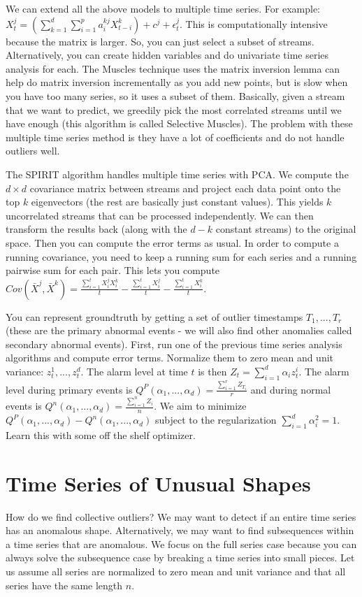 \documentclass[a4paper]{article}
\begin{document}
We can extend all the above models to multiple time series. For example:
$X_t^j = (\sum_{k=1}^{d}{\sum_{i=1}^{p}{a_i^{kj} X^k_{t-i}}}) + c^j +
\epsilon_t^j$. This is computationally intensive because the matrix is larger.
So, you can just select a subset of streams. Alternatively, you can create
hidden variables and do univariate time series analysis for each. The Muscles
technique uses the matrix inversion lemma can help do matrix inversion
incrementally as you add new points, but is slow when you have too many series,
so it uses a subset of them. Basically, given a stream that we want to predict,
we greedily pick the most correlated streams until we have enough (this
algorithm is called Selective Muscles). The problem with these multiple time
series method is they have a lot of coefficients and do not handle outliers
well.

The SPIRIT algorithm handles multiple time series with PCA. We compute the $d
\times d$ covariance matrix between streams and project each data point onto
the top $k$ eigenvectors (the rest are basically just constant values). This
yields $k$ uncorrelated streams that can be processed independently. We can
then transform the results back (along with the $d - k$ constant streams) to
the original space. Then you can compute the error terms as usual. In order
to compute a running covariance, you need to keep a running sum for each series
and a running pairwise sum for each pair. This lets you compute
$Cov(\bar{X}^j, \bar{X}^k) = \frac{\sum_{i=1}^{t}{X_i^j X_i^k}}{t}
- \frac{\sum_{i=1}^{t}{X_i^j}}{t} - \frac{\sum_{i=1}^{t}{X_i^k}}{t}$.

You can represent groundtruth by getting a set of outlier timestamps
$T_1, ..., T_r$ (these are the primary abnormal events - we will also find
other anomalies called secondary abnormal events). First, run one of the
previous time series analysis algorithms and compute error terms. Normalize them
to zero mean and unit variance: $z_t^1, ..., z_t^d$. The alarm level at time $t$
is then $Z_t = \sum_{i=1}^{d}{\alpha_i z_t^i}$. The alarm level during primary
events is $Q^P(\alpha_1, ..., \alpha_d) = \frac{\sum_{i=1}^{r}{Z_{T_i}}}{r}$
and during normal events is $Q^n(\alpha_1, ..., \alpha_d) = \frac{\sum_{i=1}^{n}
{Z_i}}{n}$. We aim to minimize $Q^P(\alpha_1, ..., \alpha_d) -
Q^n(\alpha_1, ..., \alpha_d)$ subject to the
regularization $\sum_{i=1}^{d}{\alpha_i^2} = 1$. Learn this with some off
the shelf optimizer.

\section{Time Series of Unusual Shapes}
How do we find collective outliers? We may want to detect if an entire time
series has an anomalous shape. Alternatively, we may want to find subsequences
within a time series that are anomalous. We focus on the full series case
because you can always solve the subsequence case by breaking a time
series into small pieces. Let us assume all series are normalized to zero mean
and unit variance and that all series have the same length $n$.
\end{document}
